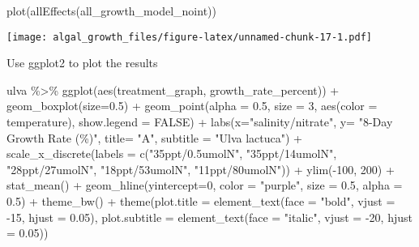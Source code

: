 \documentclass[
]{article}
\newenvironment{Shaded}{\begin{snugshade}}{\end{snugshade}}
\newcommand{\AttributeTok}[1]{\textcolor[rgb]{0.77,0.63,0.00}{#1}}
\newcommand{\ConstantTok}[1]{\textcolor[rgb]{0.00,0.00,0.00}{#1}}
\newcommand{\DecValTok}[1]{\textcolor[rgb]{0.00,0.00,0.81}{#1}}
\newcommand{\FloatTok}[1]{\textcolor[rgb]{0.00,0.00,0.81}{#1}}
\newcommand{\FunctionTok}[1]{\textcolor[rgb]{0.00,0.00,0.00}{#1}}
\newcommand{\NormalTok}[1]{#1}
\newcommand{\SpecialCharTok}[1]{\textcolor[rgb]{0.00,0.00,0.00}{#1}}
\newcommand{\StringTok}[1]{\textcolor[rgb]{0.31,0.60,0.02}{#1}}
\begin{document}
\begin{Shaded}
\begin{Highlighting}[]
\FunctionTok{plot}\NormalTok{(}\FunctionTok{allEffects}\NormalTok{(all\_growth\_model\_noint))}
\end{Highlighting}
\end{Shaded}

\texttt{[image: algal\_growth\_files/figure-latex/unnamed-chunk-17-1.pdf]}

Use ggplot2 to plot the results

\begin{Shaded}
\begin{Highlighting}[]
\NormalTok{ulva }\SpecialCharTok{\%\textgreater{}\%} \FunctionTok{ggplot}\NormalTok{(}\FunctionTok{aes}\NormalTok{(treatment\_graph, growth\_rate\_percent)) }\SpecialCharTok{+} 
  \FunctionTok{geom\_boxplot}\NormalTok{(}\AttributeTok{size=}\FloatTok{0.5}\NormalTok{) }\SpecialCharTok{+} 
  \FunctionTok{geom\_point}\NormalTok{(}\AttributeTok{alpha =} \FloatTok{0.5}\NormalTok{, }\AttributeTok{size =} \DecValTok{3}\NormalTok{, }\FunctionTok{aes}\NormalTok{(}\AttributeTok{color =}\NormalTok{ temperature), }\AttributeTok{show.legend =} \ConstantTok{FALSE}\NormalTok{) }\SpecialCharTok{+} 
  \FunctionTok{labs}\NormalTok{(}\AttributeTok{x=}\StringTok{"salinity/nitrate"}\NormalTok{, }\AttributeTok{y=} \StringTok{"8{-}Day Growth Rate (\%)"}\NormalTok{, }\AttributeTok{title=} \StringTok{"A"}\NormalTok{, }\AttributeTok{subtitle =} \StringTok{"Ulva lactuca"}\NormalTok{) }\SpecialCharTok{+} 
  \FunctionTok{scale\_x\_discrete}\NormalTok{(}\AttributeTok{labels =} \FunctionTok{c}\NormalTok{(}\StringTok{"35ppt/0.5umolN"}\NormalTok{, }\StringTok{"35ppt/14umolN"}\NormalTok{, }\StringTok{"28ppt/27umolN"}\NormalTok{, }\StringTok{"18ppt/53umolN"}\NormalTok{, }\StringTok{"11ppt/80umolN"}\NormalTok{)) }\SpecialCharTok{+} 
  \FunctionTok{ylim}\NormalTok{(}\SpecialCharTok{{-}}\DecValTok{100}\NormalTok{, }\DecValTok{200}\NormalTok{) }\SpecialCharTok{+} \FunctionTok{stat\_mean}\NormalTok{() }\SpecialCharTok{+} 
  \FunctionTok{geom\_hline}\NormalTok{(}\AttributeTok{yintercept=}\DecValTok{0}\NormalTok{, }\AttributeTok{color =} \StringTok{"purple"}\NormalTok{, }\AttributeTok{size =} \FloatTok{0.5}\NormalTok{, }\AttributeTok{alpha =} \FloatTok{0.5}\NormalTok{) }\SpecialCharTok{+}
  \FunctionTok{theme\_bw}\NormalTok{() }\SpecialCharTok{+}
  \FunctionTok{theme}\NormalTok{(}\AttributeTok{plot.title =} \FunctionTok{element\_text}\NormalTok{(}\AttributeTok{face =} \StringTok{"bold"}\NormalTok{, }\AttributeTok{vjust =} \SpecialCharTok{{-}}\DecValTok{15}\NormalTok{, }\AttributeTok{hjust =} \FloatTok{0.05}\NormalTok{), }
        \AttributeTok{plot.subtitle =} \FunctionTok{element\_text}\NormalTok{(}\AttributeTok{face =} \StringTok{"italic"}\NormalTok{, }\AttributeTok{vjust =} \SpecialCharTok{{-}}\DecValTok{20}\NormalTok{, }\AttributeTok{hjust =} \FloatTok{0.05}\NormalTok{))}
\end{Highlighting}
\end{Shaded}
\end{document}
